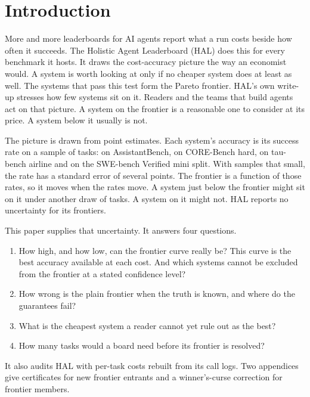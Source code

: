 \documentclass[11pt]{article}
\begin{document}
\section{Introduction}

More and more leaderboards for AI agents report what a run costs beside how often it succeeds. The Holistic Agent Leaderboard (HAL) \citep{kapoor2025hal} does this for every benchmark it hosts. It draws the cost-accuracy picture the way an economist would. A system is worth looking at only if no cheaper system does at least as well. The systems that pass this test form the Pareto frontier. HAL's own write-up stresses how few systems sit on it. Readers and the teams that build agents act on that picture. A system on the frontier is a reasonable one to consider at its price. A system below it usually is not.

The picture is drawn from point estimates. Each system's accuracy is its success rate on a sample of tasks: \NumAssistantbenchTasks{} on AssistantBench, \NumCorebenchHardTasks{} on CORE-Bench hard, \NumTaubenchAirlineTasks{} on tau-bench airline and on the SWE-bench Verified mini split. With samples that small, the rate has a standard error of several points. The frontier is a function of those rates, so it moves when the rates move. A system just below the frontier might sit on it under another draw of tasks. A system on it might not. HAL reports no uncertainty for its frontiers.

This paper supplies that uncertainty. It answers four questions.
\begin{enumerate}
\item How high, and how low, can the frontier curve really be? This curve is the best accuracy available at each cost. And which systems cannot be excluded from the frontier at a stated confidence level?
\item How wrong is the plain frontier when the truth is known, and where do the guarantees fail?
\item What is the cheapest system a reader cannot yet rule out as the best?
\item How many tasks would a board need before its frontier is resolved?
\end{enumerate}
It also audits HAL with per-task costs rebuilt from its call logs. Two appendices give certificates for new frontier entrants and a winner's-curse correction for frontier members.
\end{document}
